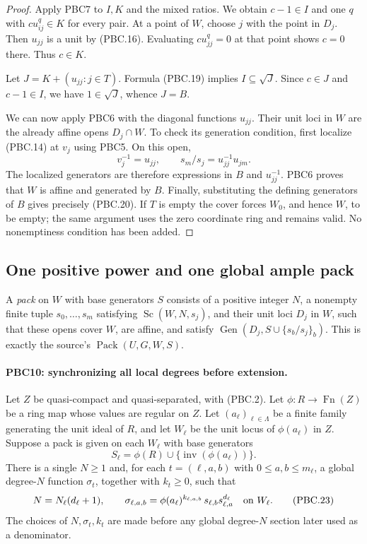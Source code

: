 \documentclass[11pt,a4paper]{article}
\numberwithin{equation}{section}
\theoremstyle{remark}\newtheorem{remark}[theorem]{Remark}
\begin{document}
\begin{proof}
Apply PBC7 to $I,K$ and the mixed ratios.  We obtain
$c-1\in I$ and one $q$ with $c u_{ij}^q\in K$ for every pair.
At a point of $W$, choose $j$ with the point in $D_j$.
Then $u_{jj}$ is a unit by (PBC.16).  Evaluating
$c u_{jj}^q=0$ at that point shows $c=0$ there.
Thus $c\in K$.

Let $J=K+(u_{jj}:j\in T)$.  Formula (PBC.19) implies
$I\subseteq\sqrt J$.  Since $c\in J$ and $c-1\in I$,
we have $1\in\sqrt J$, whence $J=B$.

We can now apply PBC6 with the diagonal functions $u_{jj}$.
Their unit loci in $W$ are the already affine opens
$D_j\cap W$.  To check its generation condition, first localize
(PBC.14) at $v_j$ using PBC5.  On this open,
\[
 v_j^{-1}=u_{jj},\qquad
 s_m/s_j=u_{jj}^{-1}u_{jm}.
                                                        \tag{PBC.21}
\]
The localized generators are therefore expressions in $B$ and
$u_{jj}^{-1}$.  PBC6 proves that $W$ is affine and generated
by $B$.  Finally, substituting the defining generators of $B$
gives precisely (PBC.20).
If $T$ is empty the cover forces $W_0$, and hence $W$, to be
empty; the same argument uses the zero coordinate ring and remains
valid.  No nonemptiness condition has been added.
\end{proof}

\subsection{One positive power and one global ample pack}

A \emph{pack} on $W$ with base generators $S$ consists of a positive
integer $N$, a nonempty finite tuple $s_0,\ldots,s_m$ satisfying
$\operatorname{Sc}(W,N,s_j)$, and their unit loci $D_j$ in $W$,
such that these opens cover $W$, are affine, and satisfy
$\operatorname{Gen}(D_j,S\cup\{s_b/s_j\}_b)$.
This is exactly the source's $\operatorname{Pack}(U,G,W,S)$.

\paragraph{PBC10: synchronizing all local degrees before extension.}
\label{claim:PBC10}
Let $Z$ be quasi-compact and quasi-separated, with (PBC.2).
Let $\phi:R\to\operatorname{Fn}(Z)$ be a ring map whose values
are regular on $Z$.  Let $(a_\ell)_{\ell\in\Lambda}$ be a finite
family generating the unit ideal of $R$, and let $W_\ell$ be
the unit locus of $\phi(a_\ell)$ in $Z$.
Suppose a pack is given on each $W_\ell$ with base generators
\[
 S_\ell=\phi(R)\cup\{\operatorname{inv}(\phi(a_\ell))\}.
                                                        \tag{PBC.22}
\]
There is a single $N\ge1$ and, for each
$t=(\ell,a,b)$ with $0\le a,b\le m_\ell$, a global
degree-$N$ function $\sigma_t$, together with $k_t\ge0$, such that
\[
 N=N_\ell(d_\ell+1),\qquad
 \sigma_{\ell,a,b}
    =\phi(a_\ell)^{k_{\ell,a,b}}\,
       s_{\ell,b}s_{\ell,a}^{d_\ell}
       \quad\hbox{on }W_\ell .
                                                        \tag{PBC.23}
\]
The choices of $N,\sigma_t,k_t$ are made before any global
degree-$N$ section later used as a denominator.
\end{document}
